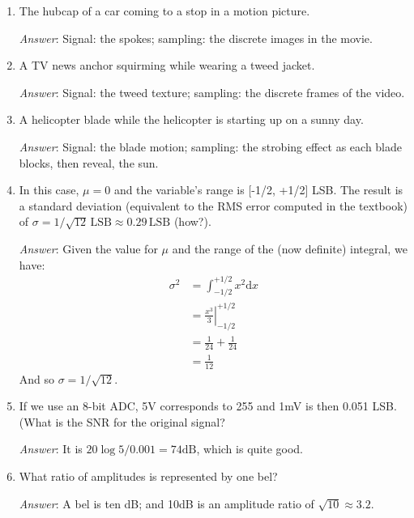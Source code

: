\begin{enumerate}

\item The hubcap of a car coming to a stop in a motion
  picture.\label{it:ch2ex1}

  \textit{Answer}: Signal: the spokes; sampling: the discrete
  images in the movie.

\item A TV news anchor squirming while wearing a tweed jacket.\label{it:ch2ex2}

  \textit{Answer}: Signal: the tweed texture; sampling: the
  discrete frames of the video.


\item A helicopter blade while the helicopter is starting up on a
  sunny day.\label{it:ch2ex3}

  \textit{Answer}: Signal: the blade motion;
  sampling: the strobing effect as each blade blocks, then reveal, the
  sun.

\item In this case, $\mu=0$ and the variable's range is [-1/2, +1/2]
  LSB. The result is a standard deviation (equivalent to the RMS error
  computed in the textbook) of $\sigma = 1/\sqrt{12} \, \textrm{LSB}
  \approx 0.29 \, \textrm{LSB}$ (how?).\label{it:ch2ex4}

  \textit{Answer}: Given the value for $\mu$
  and the range of the (now definite) integral, we have:
  \begin{align*}
    \sigma^2 &= \int_{-1/2}^{+1/2} x^2 \mathrm{d}x \\
    &= \left. \frac{x^3}{3} \right|_{-1/2}^{+1/2} \\
    &= \frac{1}{24} + \frac{1}{24} \\
    &= \frac{1}{12}
  \end{align*}
  And so $\sigma=1/\sqrt{12}$.

\item If we use an 8-bit ADC, 5V corresponds
  to 255 and 1mV is then 0.051 LSB. (What is the SNR for the original
  signal?\label{it:ch2ex5}

  \textit{Answer}: It is $20 \log 5/0.001 = 74\textrm{dB}$,
  which is quite good.

\item What ratio of amplitudes is represented by one bel?\label{it:ch2ex6}

  \textit{Answer}: A bel is ten dB; and 10dB is an amplitude
  ratio of $\sqrt{10} \approx 3.2$.


\end{enumerate}

